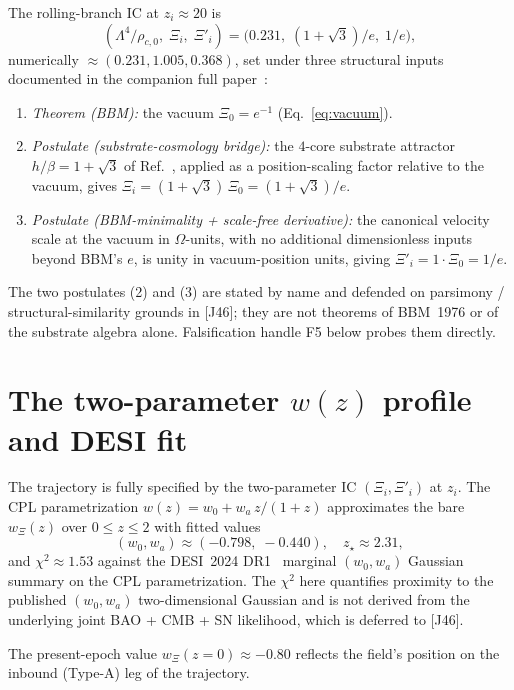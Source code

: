 \documentclass[aps,prl,reprint,floatfix,nofootinbib]{revtex4-2}
\newcommand{\Xii}{\Xi_i}
\newcommand{\Xidi}{\Xi'_i}
\newcommand{\zstar}{z_\star}
\newcommand{\rhoc}{\rho_{c,0}}
\begin{document}
The rolling-branch IC at $z_i \approx 20$ is
\begin{equation}
(\Lambda^4/\rhoc,\; \Xii,\; \Xidi)
= \big(0.231,\; (1+\sqrt{3})/e,\; 1/e\big),
\label{eq:ic}
\end{equation}
numerically $\approx (0.231, 1.005, 0.368)$, set under three
structural inputs documented in the companion full
paper~\cite{J46}:
\begin{enumerate}\setlength\itemsep{0pt}
  \item \emph{Theorem (BBM):} the vacuum $\Xi_0 = e^{-1}$
  (Eq.~\ref{eq:vacuum}).
  \item \emph{Postulate (substrate-cosmology bridge):} the
  $4$-core substrate attractor $h/\beta = 1+\sqrt{3}$ of
  Ref.~\cite{WP105SubstrateAttractor}, applied as a
  position-scaling factor relative to the vacuum, gives
  $\Xii = (1+\sqrt{3})\,\Xi_0 = (1+\sqrt{3})/e$.
  \item \emph{Postulate (BBM-minimality + scale-free
  derivative):} the canonical velocity scale at the vacuum in
  $\Omega$-units, with no additional dimensionless inputs
  beyond BBM's $e$, is unity in vacuum-position units, giving
  $\Xidi = 1 \cdot \Xi_0 = 1/e$.
\end{enumerate}
The two postulates (2) and (3) are stated by name and defended
on parsimony / structural-similarity grounds in [J46]; they
are not theorems of BBM~1976 or of the substrate algebra
alone. Falsification handle F5 below probes them directly.

\section{The two-parameter $w(z)$ profile and DESI fit}\label{sec:fit}

The trajectory is fully specified by the two-parameter IC
$(\Xii, \Xidi)$ at $z_i$. The CPL parametrization
$w(z) = w_0 + w_a\,z/(1+z)$ approximates the bare
$w_\Xi(z)$ over $0 \le z \le 2$ with fitted values
\begin{equation}
(w_0, w_a) \approx (-0.798,\; -0.440),
\quad \zstar \approx 2.31,
\label{eq:wfit}
\end{equation}
and $\chi^2 \approx 1.53$ against the DESI~2024
DR1~\cite{DESI2024,DESI2024VI} marginal $(w_0, w_a)$ Gaussian
summary on the CPL parametrization. The $\chi^2$ here
quantifies proximity to the published $(w_0, w_a)$
two-dimensional Gaussian and is not derived from the
underlying joint BAO + CMB + SN likelihood, which is deferred
to [J46].

The present-epoch value $w_\Xi(z=0) \approx -0.80$ reflects
the field's position on the inbound (Type-A) leg of the
trajectory.
\end{document}
